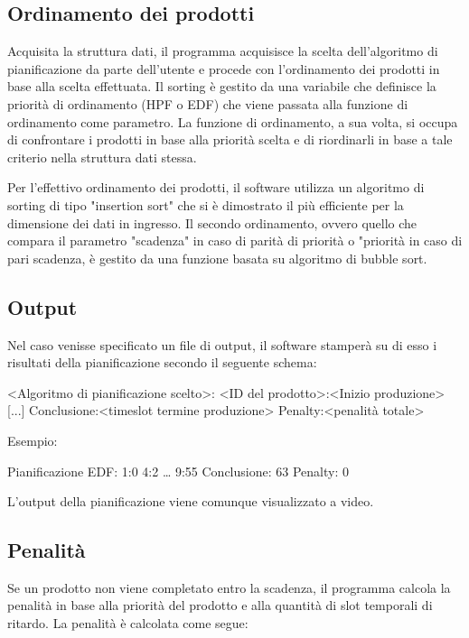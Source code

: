 \documentclass[a4paper]{report}
\begin{document}
\subsection{Ordinamento dei prodotti}
Acquisita la struttura dati, il programma acquisisce la scelta dell'algoritmo di pianificazione da parte dell'utente e procede con l'ordinamento dei prodotti in base alla scelta effettuata.
Il sorting è gestito da una variabile che definisce la priorità di ordinamento (HPF o EDF) che viene passata alla funzione di ordinamento come parametro. La funzione di ordinamento, a sua volta, si occupa di confrontare i prodotti in base alla priorità scelta e di riordinarli in base a tale criterio nella struttura dati stessa.

Per l'effettivo ordinamento dei prodotti, il software utilizza un algoritmo di sorting di tipo "insertion sort" che si è dimostrato il più efficiente per la dimensione dei dati in ingresso.
Il secondo ordinamento, ovvero quello che compara il parametro "scadenza" in caso di parità di priorità o "priorità in caso di pari scadenza, è gestito da una funzione basata su algoritmo di bubble sort.

\subsection{Output}
Nel caso venisse specificato un file di output, il software stamperà su di esso i risultati della pianificazione secondo il seguente schema:


\begin{myverbatim}
<Algoritmo di pianificazione scelto>:
<ID del prodotto>:<Inizio produzione>
[...]
Conclusione:<timeslot termine produzione>
Penalty:<penalità totale>
\end{myverbatim}


\small{Esempio:}

\begin{myverbatim}
Pianificazione EDF:
1:0
4:2
\dots
9:55
Conclusione: 63
Penalty: 0
  \end{myverbatim}
L'output della pianificazione viene comunque visualizzato a video.

\subsection{Penalità}
Se un prodotto non viene completato entro la scadenza, il programma calcola la penalità in base alla priorità del prodotto e alla quantità di slot temporali di ritardo. La penalità è calcolata come segue:
\end{document}
